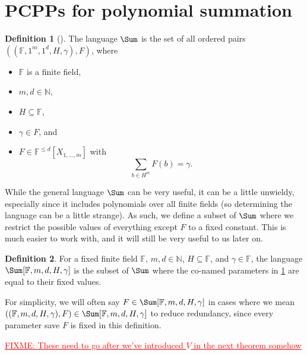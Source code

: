 \documentclass[english,12pt]{reedthesis}
\theoremstyle{plain}
\theoremstyle{definition}
\newtheorem{defn}[defn]{Definition}
\theoremstyle{remark}
\newcommand{\FIXME}[1]{\textcolor{red}{\ul{FIXME: #1}}}
\begin{document}
\section{PCPPs for polynomial summation}\label{sec:pcpp-poly-sum}

\begin{defn}[{\cite[Def.\ 4.1]{GOS25}}]\label{def:sum-lang}
  The language $\Sum$ is the set of all ordered pairs
  $((\mathbb{F}, 1^{m}, 1^{d}, H, \gamma), F)$, where
  \begin{itemize}
    \item $\mathbb{F}$ is a finite field,
    \item $m, d \in \mathbb{N}$,
    \item $H \subseteq \mathbb{F}$,
    \item $\gamma \in F$, and
    \item $F \in \mathbb{F}^{\le d}[X_{1, \ldots, m}]$ with
          \[
            \sum_{b \in H^{m}}F(b) = \gamma.
          \]
  \end{itemize}
\end{defn}

While the general language $\Sum$ can be very useful, it can be a little
unwieldy, especially since it includes polynomials over all finite fields (so
determining the language can be a little strange). As such, we define a subset
of $\Sum$ where we restrict the possible values of everything except $F$ to a
fixed constant. This is much easier to work with, and it will still be very
useful to us later on.

\begin{defn}\label{def:sum-params}
  For a fixed finite field $\mathbb{F}$, $m, d \in \mathbb{N}$, $H \subseteq \mathbb{F}$, and
  $\gamma \in \mathbb{F}$, the language $\Sum[\mathbb{F}, m, d, H, \gamma]$ is the subset of
  $\Sum$ where the co-named parameters in \cref{def:sum-lang} are equal to their
  fixed values.
\end{defn}

For simplicity, we will often say $F \in \Sum[\mathbb{F}, m, d, H, \gamma]$ in cases
where we mean $((\mathbb{F}, m, d, H, \gamma), F) \in \Sum[\mathbb{F}, m, d, H, \gamma]$ to
reduce redundancy, since every parameter save $F$ is fixed in this definition.

\FIXME{These need to go after we've introduced $V$ in the next theorem somehow}
\end{document}
